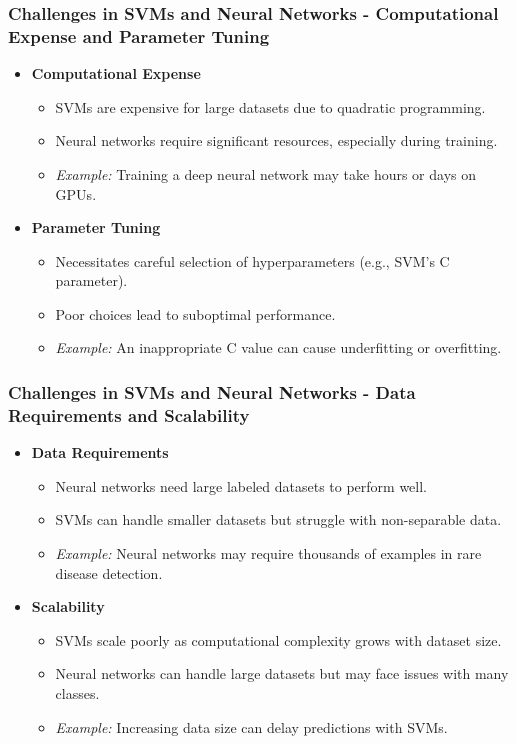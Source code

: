 \documentclass[aspectratio=169]{beamer}
\begin{document}
\begin{frame}[fragile]
    \frametitle{Challenges in SVMs and Neural Networks - Computational Expense and Parameter Tuning}
    \begin{itemize}
        \item \textbf{Computational Expense}
        \begin{itemize}
            \item SVMs are expensive for large datasets due to quadratic programming.
            \item Neural networks require significant resources, especially during training.
            \item \textit{Example:} Training a deep neural network may take hours or days on GPUs.
        \end{itemize}
        \item \textbf{Parameter Tuning}
        \begin{itemize}
            \item Necessitates careful selection of hyperparameters (e.g., SVM's C parameter).
            \item Poor choices lead to suboptimal performance.
            \item \textit{Example:} An inappropriate C value can cause underfitting or overfitting.
        \end{itemize}
    \end{itemize}
\end{frame}

\begin{frame}[fragile]
    \frametitle{Challenges in SVMs and Neural Networks - Data Requirements and Scalability}
    \begin{itemize}
        \item \textbf{Data Requirements}
        \begin{itemize}
            \item Neural networks need large labeled datasets to perform well.
            \item SVMs can handle smaller datasets but struggle with non-separable data.
            \item \textit{Example:} Neural networks may require thousands of examples in rare disease detection.
        \end{itemize}
        \item \textbf{Scalability}
        \begin{itemize}
            \item SVMs scale poorly as computational complexity grows with dataset size.
            \item Neural networks can handle large datasets but may face issues with many classes.
            \item \textit{Example:} Increasing data size can delay predictions with SVMs.
        \end{itemize}
    \end{itemize}
\end{frame}
\end{document}
